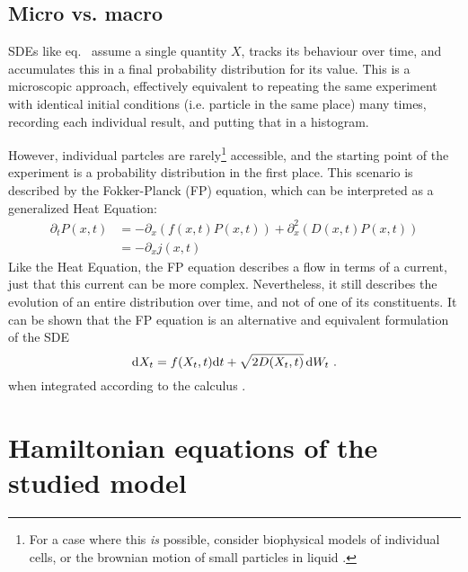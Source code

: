 \subsection{Micro vs. macro}
\label{sec:fp introduction}

SDEs like eq.~ assume a single quantity \(X\), tracks its behaviour over time, and accumulates this in a final probability distribution for its value. This is a microscopic approach, effectively equivalent to repeating the same experiment with identical initial conditions (i.e. particle in the same place) many times, recording each individual result, and putting that in a histogram.

However, individual partcles are rarely\footnote{For a case where this \emph{is} possible, consider biophysical models of individual cells, or the brownian motion of small particles in liquid \cite{sengupta}.} accessible, and the starting point of the experiment is a probability distribution in the first place. This scenario is described by the Fokker-Planck (FP) equation, which can be interpreted as a generalized Heat Equation:
%
\begin{equation}
	\label{eqn:fp}
	\begin{split}
	\partial_tP(x,t)
	&= - \partial_x (f(x,t)P(x,t)) + \partial_x^2 (D(x,t)P(x,t)) \\
	&= -\partial_xj(x,t)
	\end{split}
\end{equation}
%
Like the Heat Equation, the FP equation describes a flow in terms of a current, just that this current can be more complex. Nevertheless, it still describes the evolution of an entire distribution over time, and not of one of its constituents. It can be shown that the FP equation is an alternative and equivalent formulation of the SDE
%
\begin{equation}
	\mathrm{d} X_t = f(X_t,t)\mathrm{d} t + \sqrt{2 D(X_t,t)}\,\mathrm{d} W_t ~.
\end{equation}
%
when integrated according to the \Ito{} calculus \cite{sde}.




\section{Hamiltonian equations of the studied model}

